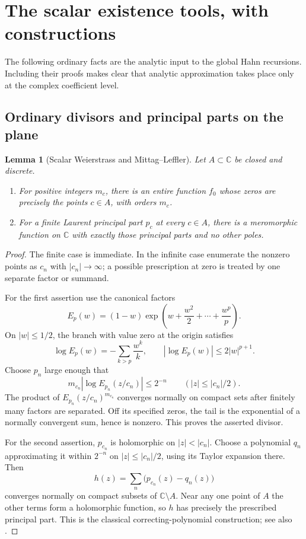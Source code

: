 \documentclass[11pt,letterpaper]{article}
\newtheorem{lemma}[theorem]{Lemma}
\theoremstyle{definition}
\theoremstyle{remark}
\newcommand{\C}{\mathbb C}
\numberwithin{equation}{section}
\begin{document}
\section{The scalar existence tools, with constructions}\label{sec:scalar}
The following ordinary facts are the analytic input to the global Hahn recursions. Including their proofs makes clear that analytic approximation takes place only at the complex coefficient level.

\subsection{Ordinary divisors and principal parts on the plane}
\begin{lemma}[Scalar Weierstrass and Mittag--Leffler]\label{lem:scalarML}
Let $A\subset\C$ be closed and discrete.
\begin{enumerate}
\item For positive integers $m_c$, there is an entire function $f_0$ whose zeros are precisely the points $c\in A$, with orders $m_c$.
\item For a finite Laurent principal part $p_c$ at every $c\in A$, there is a meromorphic function on $\C$ with exactly those principal parts and no other poles.
\end{enumerate}
\end{lemma}
\begin{proof}
The finite case is immediate. In the infinite case enumerate the nonzero points as $c_n$ with $|c_n|\to\infty$; a possible prescription at zero is treated by one separate factor or summand.

For the first assertion use the canonical factors
\[
 E_p(w)=(1-w)\exp\left(w+\frac{w^2}{2}+\cdots+\frac{w^p}{p}\right).
\]
On $|w|\le1/2$, the branch with value zero at the origin satisfies
\[
 \log E_p(w)=-\sum_{k>p}\frac{w^k}{k},
 \qquad |\log E_p(w)|\le2|w|^{p+1}.
\]
Choose $p_n$ large enough that
\[
 m_{c_n}|\log E_{p_n}(z/c_n)|\le2^{-n}
 \qquad (|z|\le |c_n|/2).
\]
The product of $E_{p_n}(z/c_n)^{m_{c_n}}$ converges normally on compact sets after finitely many factors are separated. Off its specified zeros, the tail is the exponential of a normally convergent sum, hence is nonzero. This proves the asserted divisor.

For the second assertion, $p_{c_n}$ is holomorphic on $|z|<|c_n|$. Choose a polynomial $q_n$ approximating it within $2^{-n}$ on $|z|\le|c_n|/2$, using its Taylor expansion there. Then
\[
 h(z)=\sum_n\bigl(p_{c_n}(z)-q_n(z)\bigr)
\]
converges normally on compact subsets of $\C\setminus A$. Near any one point of $A$ the other terms form a holomorphic function, so $h$ has precisely the prescribed principal part. This is the classical correcting-polynomial construction; see also \cite[Theorem~3.26]{McMullen}.
\end{proof}
\end{document}

